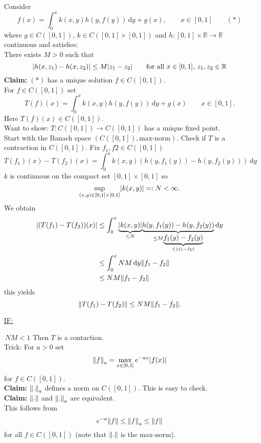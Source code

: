 \begin{beispiel}
	Consider
	\[
		f(x) = \int_{0}^{x}k(x,y)h(y,f(y)) \,\mathrm{d}y + g(x), \qquad x \in [0,1] \qquad (*)
	\]
	where $g \in C([0,1])$, $k \in C([0,1] \times [0,1])$ and $h: [0,1] \times \mathbb{R} \to \mathbb{R}$ continuous and satisfies: \\
	There exists $M>0$ such that
	\[
		\lvert h(x,z_1)-h(x,z_2)\rvert \leq M \lvert z_1- z_2\rvert \qquad \text{for all }x \in [0,1],\,z_1,z_2 \in \mathbb{R}
	\]
	\textbf{Claim:} \text{    }     $(*)$ has a unique solution $f \in C([0,1])$. \\ For $f \in C([0,1])$ set
	\[
		T(f)(x) = \int_{0}^{x}k(x,y)h(y,f(y)) \,\mathrm{d}y + g(x) \qquad x \in [0,1].
	\]
	Here $T(f)(x) \in C([0,1])$. \\ Want to show: $T: C([0,1]) \to C([0,1])$ has a unique fixed point. \\
	Start with the Banach space $(C([0,1]), \text{max-norm})$. Check if $T$ is a contraction in $C([0,1])$. Fix $f_1,f2 \in C([0,1])$
	\[
		T(f_1)(x)- T(f_2)(x) = \int_{0}^{x} k(x,y)(h(y,f_1(y))-h(y,f_2(y))) \,\mathrm{d}y
	\] 
	$k$ is continuous on the compact set $[0,1] \times [0,1]$ so 
	\[
		\sup\limits_{(x,y) \in [0,1]\times[0,1]} \lvert k(x,y)\rvert =: N < \infty.
	\]
	We obtain 
	\begin{align*}
		\abs{(T(f_1)-T(f_2))(x)} &\leq \int_{0}^{x} \underset{\leq N}{\underbrace{\abs{k(x,y)}}}\underset{\leq M \underset{\leq \norm{f_1-f_2}}{\underbrace{f_1(y)-f_2(y)}}}{\underbrace{h(y,f_1(y))-h(y,f_2(y))}} \,\mathrm{d}y \\ & \leq \int_{0}^{x}NM \,\mathrm{d}y \norm{f_1-f_2} \\& \leq NM \norm{f_1-f_2}
		\end{align*}
	this yields
	\[
		\norm{T(f_1)-T(f_2)} \leq NM \norm{f_1-f_2}.
	\]
	\begin{Large}
		\underline{IF:}
	\end{Large} \,$NM<1$ Then $T$ is a contaction. \\ Trick: For $a >0$ set 
	\[
		\norm{f}_a = \max\limits_{x \in [0,1]} e^{-ax}\abs{f(x)}
	\] 
	for $f \in C([0,1])$. \\
	\textbf{Claim:} \text{    }     $\norm{.}_a$ defines a norm on $C([0,1])$. This is easy to check. \\
	\textbf{Claim:} \text{    }     $\norm{.}$ and $\norm{.}_a$ are equivalent. \\
	This follows from
	\[
		e^{-a} \norm{f} \leq \norm{f}_a \leq \norm{f}
	\]
	for all $f \in C([0,1])$ (note that $\norm{.}$ is the max-norm).\\

\end{beispiel}
